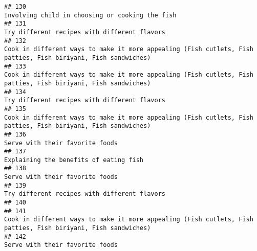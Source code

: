 \documentclass[
]{article}
\begin{document}
\begin{verbatim}
## 130                                                                                                                                                              Involving child in choosing or cooking the fish
## 131                                                                                                                                                                 Try different recipes with different flavors
## 132                                                                                                Cook in different ways to make it more appealing (Fish cutlets, Fish patties, Fish biriyani, Fish sandwiches)
## 133                                                                                                Cook in different ways to make it more appealing (Fish cutlets, Fish patties, Fish biriyani, Fish sandwiches)
## 134                                                                                                                                                                 Try different recipes with different flavors
## 135                                                                                                Cook in different ways to make it more appealing (Fish cutlets, Fish patties, Fish biriyani, Fish sandwiches)
## 136                                                                                                                                                                              Serve with their favorite foods
## 137                                                                                                                                                                       Explaining the benefits of eating fish
## 138                                                                                                                                                                              Serve with their favorite foods
## 139                                                                                                                                                                 Try different recipes with different flavors
## 140                                                                                                                                                                                                             
## 141                                                                                                Cook in different ways to make it more appealing (Fish cutlets, Fish patties, Fish biriyani, Fish sandwiches)
## 142                                                                                                                                                                              Serve with their favorite foods

\end{verbatim}
\end{document}
